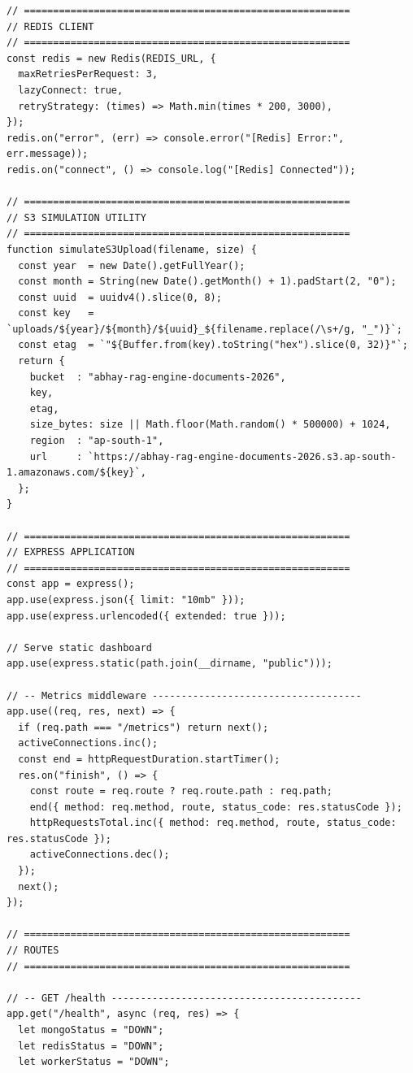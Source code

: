 \documentclass[12pt,a4paper]{report}
\begin{document}
\begin{lstlisting}
// ========================================================
// REDIS CLIENT
// ========================================================
const redis = new Redis(REDIS_URL, {
  maxRetriesPerRequest: 3,
  lazyConnect: true,
  retryStrategy: (times) => Math.min(times * 200, 3000),
});
redis.on("error", (err) => console.error("[Redis] Error:", err.message));
redis.on("connect", () => console.log("[Redis] Connected"));

// ========================================================
// S3 SIMULATION UTILITY
// ========================================================
function simulateS3Upload(filename, size) {
  const year  = new Date().getFullYear();
  const month = String(new Date().getMonth() + 1).padStart(2, "0");
  const uuid  = uuidv4().slice(0, 8);
  const key   = `uploads/${year}/${month}/${uuid}_${filename.replace(/\s+/g, "_")}`;
  const etag  = `"${Buffer.from(key).toString("hex").slice(0, 32)}"`;
  return {
    bucket  : "abhay-rag-engine-documents-2026",
    key,
    etag,
    size_bytes: size || Math.floor(Math.random() * 500000) + 1024,
    region  : "ap-south-1",
    url     : `https://abhay-rag-engine-documents-2026.s3.ap-south-1.amazonaws.com/${key}`,
  };
}

// ========================================================
// EXPRESS APPLICATION
// ========================================================
const app = express();
app.use(express.json({ limit: "10mb" }));
app.use(express.urlencoded({ extended: true }));

// Serve static dashboard
app.use(express.static(path.join(__dirname, "public")));

// -- Metrics middleware ------------------------------------
app.use((req, res, next) => {
  if (req.path === "/metrics") return next();
  activeConnections.inc();
  const end = httpRequestDuration.startTimer();
  res.on("finish", () => {
    const route = req.route ? req.route.path : req.path;
    end({ method: req.method, route, status_code: res.statusCode });
    httpRequestsTotal.inc({ method: req.method, route, status_code: res.statusCode });
    activeConnections.dec();
  });
  next();
});

// ========================================================
// ROUTES
// ========================================================

// -- GET /health -------------------------------------------
app.get("/health", async (req, res) => {
  let mongoStatus = "DOWN";
  let redisStatus = "DOWN";
  let workerStatus = "DOWN";


\end{lstlisting}
\end{document}
